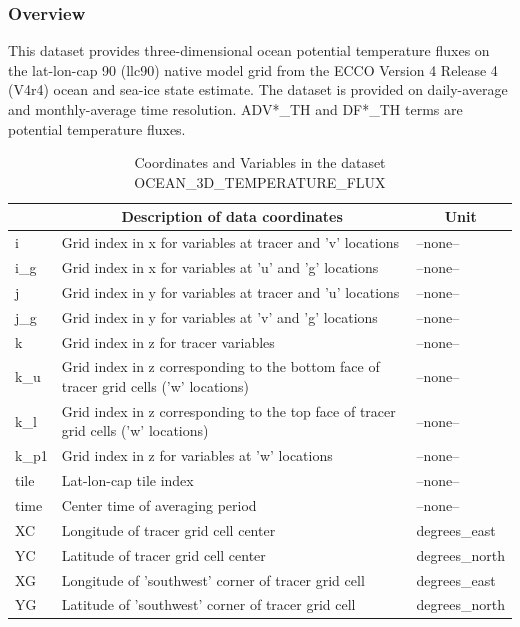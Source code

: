 \subsubsection{Overview}
This dataset provides three-dimensional ocean potential temperature fluxes on the lat-lon-cap 90 (llc90) native model grid from the ECCO Version 4 Release 4 (V4r4) ocean and sea-ice state estimate. The dataset is provided on daily-average and monthly-average time resolution. ADV*\_TH and DF*\_TH terms are potential temperature fluxes. 
\begin{longtable}{|m{}|m{}|m{}|}
\caption{Coordinates and Variables in the dataset OCEAN\_3D\_TEMPERATURE\_FLUX}
\label{tab:table-OCEAN_3D_TEMPERATURE_FLUX-fields} \\ 
\hline \endhead \hline \endfoot
\rowcolor{lightgray} \multicolumn{1}{|c|}{\textbf{Coordinates}} & \multicolumn{1}{|c|}{\textbf{Description of data coordinates}} &  \multicolumn{1}{|c|}{\textbf{Unit}}\\ \hline
i &Grid index in x for variables at tracer and 'v' locations &--none--  \\ \hline
i\_g &Grid index in x for variables at 'u' and 'g' locations &--none--  \\ \hline
j &Grid index in y for variables at tracer and 'u' locations &--none--  \\ \hline
j\_g &Grid index in y for variables at 'v' and 'g' locations &--none--  \\ \hline
k &Grid index in z for tracer variables &--none--  \\ \hline
k\_u &Grid index in z corresponding to the bottom face of tracer grid cells ('w' locations) &--none--  \\ \hline
k\_l &Grid index in z corresponding to the top face of tracer grid cells ('w' locations) &--none--  \\ \hline
k\_p1 &Grid index in z for variables at 'w' locations &--none--  \\ \hline
tile &Lat-lon-cap tile index &--none--  \\ \hline
time &Center time of averaging period &--none--  \\ \hline
XC &Longitude of tracer grid cell center &degrees\_east  \\ \hline
YC &Latitude of tracer grid cell center &degrees\_north  \\ \hline
XG &Longitude of 'southwest' corner of tracer grid cell &degrees\_east  \\ \hline
YG &Latitude of 'southwest' corner of tracer grid cell &degrees\_north  \\ \hline

\end{longtable}
